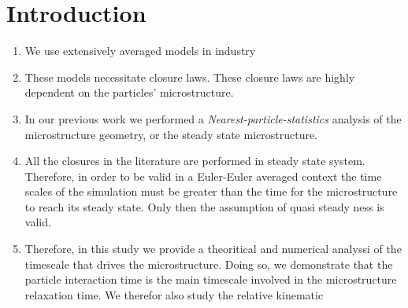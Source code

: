 \section{Introduction}





\begin{enumerate}
    \item We use extensively averaged models in industry 
    \item These models necessitate closure laws. These closure laws are highly dependent on the particles' microstructure. 
    \item In our previous work we performed a \textit{Nearest-particle-statistics} analysis of the microstructure geometry, or the steady state microstructure. 
    \item All the closures in the literature are performed in steady state system. 
    Therefore, in order to be valid in a Euler-Euler averaged context the time scales of the simulation must be greater than the time for the microstructure to reach its steady state. 
    Only then the assumption of quasi steady ness is valid.    
    \item Therefore, in this study we provide a theoritical and numerical analyssi of the timescale that drives the microstructure. 
    Doing so, we demonstrate that the particle interaction time is the main timescale involved in the microstructure relaxation time. 
    We therefor also study the relative kinematic
\end{enumerate}